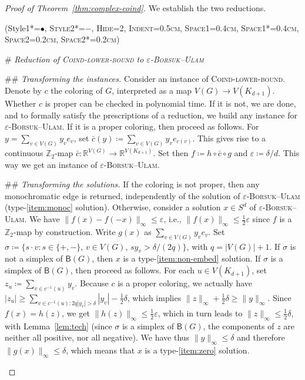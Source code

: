 \documentclass[12pt]{amsart}
\theoremstyle{definition}
\def\R{\mathbb{R}}
\def\Z{\mathbb{Z}}
\def\B{\mathsf{B}}
\renewcommand{\geq}{\geqslant}
\renewcommand{\leq}{\leqslant}
\begin{document}
\begin{proof}[Proof of Theorem~\ref{thm:complex-coind}] We establish the two reductions.

\begin{easylist}\ListProperties(Style1*=\scshape$\bullet$, Style2*=$-$, Hide=2, Indent=0.5cm, Space1=0.4cm, Space1*=0.4cm, Space2=0.2cm, Space2*=0.2cm)

# {\em Reduction of \textsc{Coind-lower-bound} to \textsc{$\varepsilon$-Borsuk--Ulam}}

## {\em Transforming the instances.}
Consider an instance of \textsc{Coind-lower-bound}. Denote by $c$ the coloring of $G$, interpreted as a map $V(G) \rightarrow V(K_{d+1})$. Whether $c$ is proper can be checked in polynomial time. If it is not, we are done, and to formally satisfy the prescriptions of a reduction, we build any instance for \textsc{$\varepsilon$-Borsuk--Ulam}. If it is a proper coloring, then proceed as follows. For $y=\sum_{v\in V(G)}y_ve_v$, set $\bar c(y)\coloneqq  \sum_{v\in V(G)}y_ve_{c(v)}$. This gives rise to a continuous $\Z_2$-map $\bar c\colon \R^{V(G)} \rightarrow \R^{V(K_{d+1})}$. Set then $f \coloneqq h \circ \bar c \circ g$ and $\varepsilon\coloneqq \delta/d$. This way we get an instance of \textsc{$\varepsilon$-Borsuk--Ulam}.

## {\em Transforming the solutions.} If the coloring is not proper, then any monochromatic edge is returned, independently of the solution of \textsc{$\varepsilon$-Borsuk--Ulam} (type-\eqref{item:monoc} solution). Otherwise, consider a solution $x \in S^d$ of \textsc{$\varepsilon$-Borsuk--Ulam}. We have $\|f(x)-f(-x)\|_{\infty} \leq \varepsilon$, i.e., $\|f(x)\|_{\infty}\leq \frac 1 2 \varepsilon$ since $f$ is a $\Z_2$-map by construction. Write $g(x)$ as $\sum_{v\in V(G)}y_ve_v$. Set $\sigma\coloneqq \{s\cdot v\colon s\in \{+,-\},\, v \in V(G),\, s y_v >\delta/(2q)\}$, with $q=|V(G)|+1$. If $\sigma$ is not a simplex of $\B(G)$, then $x$ is a type-\eqref{item:non-embed} solution. If $\sigma$ is a simplex of $\B(G)$, then proceed as follows. For each $u \in V(K_{d+1})$, set $z_u \coloneqq \sum_{v\in c^{-1}(u)}y_v$. Because $c$ is a proper coloring, we actually have $|z_u| \geq  \sum_{v\in c^{-1}(u)\colon 2q|y_v|>\delta}|y_v| - \frac 1 2 \delta$, 
which implies $\|z\|_{\infty}+\frac 1 2 \delta \geq \|y\|_{\infty}$. Since $f(x)=h(z)$, we get $\|h(z)\|_{\infty} \leq \frac 1 2 \varepsilon$, which in turn leads to $\|z\|_{\infty} \leq\frac 1 2 \delta$, with Lemma~\ref{lem:tech} (since $\sigma$ is a simplex of $\B(G)$, the components of $z$ are neither all positive, nor all negative). We have thus $\|y\|_{\infty} \leq \delta$ and therefore $\|g(x)\|_{\infty} \leq \delta$, which means that $x$ is a type-\eqref{item:zero} solution.


\end{easylist}
\end{proof}
\end{document}
